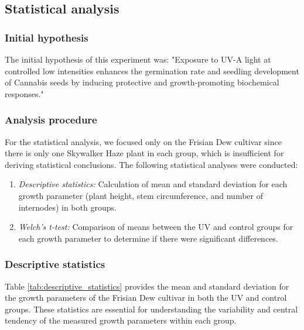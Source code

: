 \subsection{Statistical analysis}

\subsubsection{Initial hypothesis}

The initial hypothesis of this experiment was: "Exposure to UV-A light at controlled low intensities enhances the germination rate and seedling development of Cannabis seeds by inducing protective and growth-promoting biochemical responses."

\subsubsection{Analysis procedure}

For the statistical analysis, we focused only on the Frisian Dew cultivar since there is only one Skywalker Haze plant in each group, which is insufficient for deriving statistical conclusions. The following statistical analyses were conducted:
\begin{enumerate}
    \item \emph{Descriptive statistics:} Calculation of mean and standard deviation for each growth parameter (plant height, stem circumference, and number of internodes) in both groups.
    \item \emph{Welch's t-test:} Comparison of means between the UV and control groups for each growth parameter to determine if there were significant differences.
\end{enumerate}

\subsubsection{Descriptive statistics}

Table \ref{tab:descriptive_statistics} provides the mean and standard deviation for the growth parameters of the Frisian Dew cultivar in both the UV and control groups. These statistics are essential for understanding the variability and central tendency of the measured growth parameters within each group.


